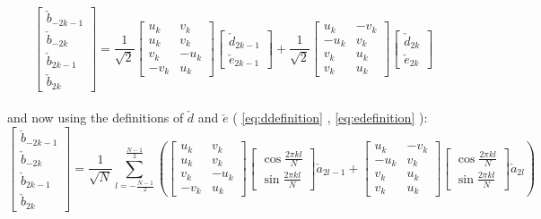 \documentclass[10pt,a4paper]{article}
\begin{document}
\begin{equation}\label{eq:orthogonaevenodd}\left[\begin{array}{c}
\check{b}_{-2 k-1} \\
\check{b}_{-2 k} \\
\check{b}_{2 k-1} \\
\check{b}_{2 k}
\end{array}\right]=\frac{1}{\sqrt{2}}\left[\begin{array}{cc}
u_{k} & v_{k}  \\
u_{k} & v_{k}  \\
v_{k} & -u_{k} \\
-v_{k} & u_{k} 
\end{array}\right]\left[\begin{array}{c}
\check{d}_{2 k-1} \\
\check{e}_{2 k-1} 
\end{array}\right]+\frac{1}{\sqrt{2}}\left[\begin{array}{cc}
u_{k} & -v_{k}  \\
-u_{k} & v_{k}  \\
v_{k} & u_{k} \\
v_{k} & u_{k} 
\end{array}\right]\left[\begin{array}{c}
\check{d}_{2 k} \\
\check{e}_{2 k} 
\end{array}\right]\end{equation}\\
and now using the definitions of $\check{d}$ and $\check{e}$ ( \ref{eq:ddefinition} , \ref{eq:edefinition} ):
\begin{equation}\label{eq:orthogonalba}\left[\begin{array}{c}
\check{b}_{-2 k-1} \\
\check{b}_{-2 k} \\
\check{b}_{2 k-1} \\
\check{b}_{2 k}
\end{array}\right]=\frac{1}{\sqrt{N}}\sum_{l=-\frac{N-1}{2}}^{\frac{N-1}{2}}\left(\left[\begin{array}{cc}
u_{k} & v_{k}  \\
u_{k} & v_{k}  \\
v_{k} & -u_{k} \\
-v_{k} & u_{k} 
\end{array}\right]\left[\begin{array}{c}
 \cos \frac{2 \pi k l}{N}  \\
 \sin \frac{2 \pi k l}{N}  
\end{array}\right]\check{a}_{2l-1}+
\left[\begin{array}{cc}
u_{k} & -v_{k}  \\
-u_{k} & v_{k}  \\
v_{k} & u_{k} \\
v_{k} & u_{k} 
\end{array}\right]\left[\begin{array}{c}
\cos \frac{2 \pi k l}{N}  \\
\sin \frac{2 \pi k l}{N}  
\end{array}\right]\check{a}_{2l}\right) \end{equation}
\end{document}
